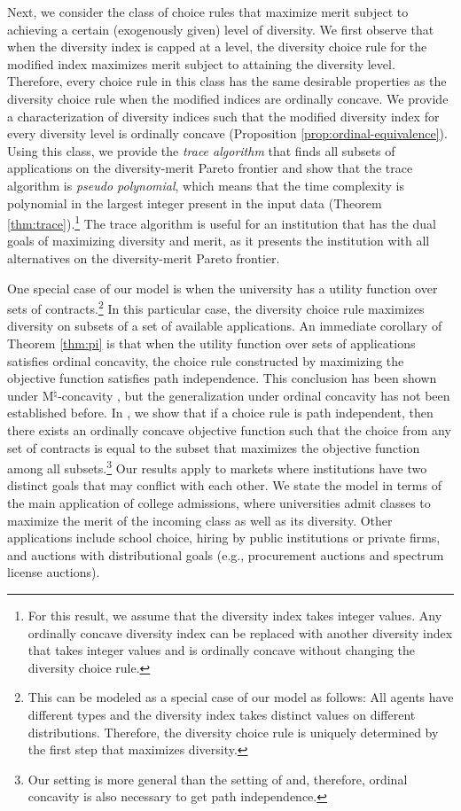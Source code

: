 \documentclass[12pt]{amsart}
\theoremstyle{remark}
\begin{document}
Next, we consider the class of choice rules that maximize merit subject to achieving
a certain (exogenously given) level of diversity.
We first observe that when the diversity index
is capped at a level, the diversity choice rule for
the modified index maximizes merit subject to attaining the diversity level.
Therefore, every choice rule in this class has the same desirable properties as the
diversity choice rule when the modified indices are ordinally concave. We provide a characterization of
diversity indices such that the modified diversity index for every diversity level is ordinally
concave (Proposition \ref{prop:ordinal-equivalence}). Using this class, we provide the \emph{trace algorithm} that
finds all subsets of applications on the diversity-merit Pareto frontier and show that the trace algorithm is \emph{pseudo polynomial}, which
means that the time complexity is polynomial in the largest integer present in the
input data (Theorem \ref{thm:trace}).\footnote{For this result, we assume that the diversity index takes integer values. Any ordinally
concave diversity index can be replaced with another diversity index that takes integer values and is ordinally concave without changing the
diversity choice rule.} The trace algorithm is useful for an
institution that has the dual goals of maximizing diversity and merit, as
it presents the institution with all alternatives on the diversity-merit
Pareto frontier.


One special case of our model is when the university has a utility function
over sets of contracts.\footnote{This can be modeled as a special case of our
model as follows: All agents have different types and
the diversity index takes distinct values on different distributions. Therefore, the
diversity choice rule is uniquely determined by the first step that maximizes diversity.}
In this particular case, the diversity choice rule maximizes diversity on subsets
of a set of available applications.
An immediate corollary of Theorem \ref{thm:pi} is that when the utility function
over sets of applications satisfies ordinal concavity, the choice rule
constructed by maximizing the objective function satisfies path independence.
This conclusion has been shown under M$^{\natural}$-concavity \citep{eguchi2003generalized},
but the generalization under ordinal concavity has not been established before.
In \cite{hakoyeyo22}, we show that if a choice rule is path independent, then there exists an ordinally concave objective function such that
the choice from any set of contracts is equal to the subset that maximizes the objective function among all subsets.\footnote{Our
setting is more general than the setting of \cite{hakoyeyo22} and, therefore, ordinal concavity is also necessary to get path independence.}
Our results apply to markets where institutions have two
distinct goals that may conflict with each other. We state the model in terms of
the main application of college admissions, where universities admit classes
to maximize the merit of the incoming class as well as its diversity.
Other applications include school choice,
hiring by public institutions or private firms, and auctions
with distributional goals (e.g., procurement auctions and spectrum license auctions).
\end{document}
